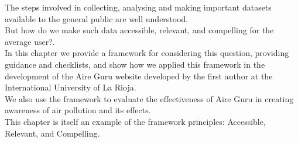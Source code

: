 The steps involved in collecting, analysing and making important datasets available to the general public are well understood. \\

But how do we make such data accessible, relevant, and compelling for the average user?. \\

In this chapter we provide a framework for considering this question, providing guidance and checklists,
and show how we applied this framework in the development of the Aire Guru website developed by the first
author at the International University of La Rioja. \\

We also use the framework to evaluate the effectiveness of Aire Guru in creating awareness of air pollution and its effects. \\

This chapter is itself an example of the framework principles: Accessible, Relevant, and Compelling. \\